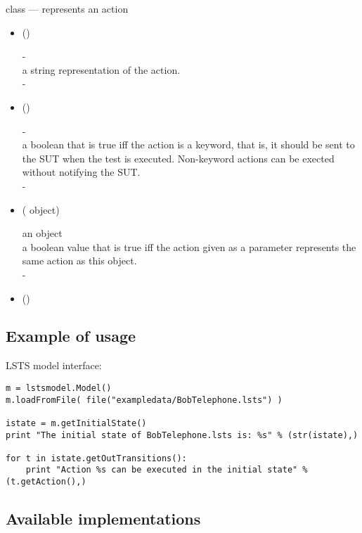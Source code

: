 \documentclass{article}
\begin{document}
\noindent{} class --- represents an action
\begin{itemize}
\item[] ()
  \begin{quot}
     -\\
     a string representation of the action.
    \\
     -
  \end{quot}
\item[] ()
  \begin{quot}
     -\\
     a boolean that is true iff the action is a
    keyword, that is, it should be sent to the SUT when the test is
    executed. Non-keyword actions can be exected without notifying the
    SUT.
    \\
     -
  \end{quot}
\item[] ( object)
  \begin{quot}
     an  object\\
     a boolean value that is true iff the action given
    as a parameter represents the same action as this object.
    \\
     -
  \end{quot}
\item[] ()
\end{itemize}


\subsection{Example of usage}

LSTS model interface:
\begin{verbatim}
m = lstsmodel.Model()
m.loadFromFile( file("exampledata/BobTelephone.lsts") )

istate = m.getInitialState()
print "The initial state of BobTelephone.lsts is: %s" % (str(istate),)

for t in istate.getOutTransitions():
    print "Action %s can be executed in the initial state" % (t.getAction(),)
\end{verbatim}


\subsection{Available implementations}
\end{document}
